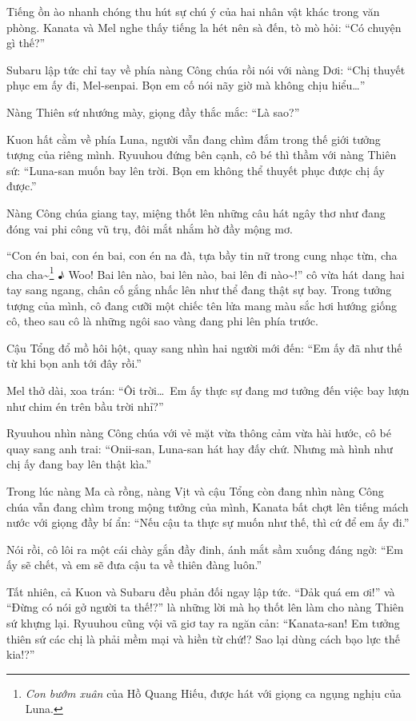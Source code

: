 \documentclass[../main.tex]{subfiles}
\begin{document}
Tiếng ồn ào nhanh chóng thu hút sự chú ý của hai nhân vật khác trong văn phòng. Kanata và Mel nghe thấy tiếng la hét nên sà đến, tò mò hỏi: ``Có chuyện gì thế?''


Subaru lập tức chỉ tay về phía nàng Công chúa rồi nói với nàng Dơi: ``Chị thuyết phục em ấy đi, Mel-senpai. Bọn em cố nói nãy giờ mà không chịu hiểu\dots''

Nàng Thiên sứ nhướng mày, giọng đầy thắc mắc: ``Là sao?''

Kuon hất cằm về phía Luna, người vẫn đang chìm đắm trong thế giới tưởng tượng của riêng mình. Ryuuhou đứng bên cạnh, cô bé thì thầm với nàng Thiên sứ: ``Luna-san muốn bay lên trời. Bọn em không thể thuyết phục được chị ấy được.''

Nàng Công chúa giang tay, miệng thốt lên những câu hát ngây thơ như đang đóng vai phi công vũ trụ, đôi mắt nhắm hờ đầy mộng mơ.

``Con én bai, con én bai, con én na đà, tựa bầy tin nữ trong cung nhạc từn, cha cha cha\~{}{}\footnote{\textit{Con bướm xuân} của Hồ Quang Hiếu, được hát với giọng ca ngụng nghịu của Luna.} ♪ Woo! Bai lên nào, bai lên nào, bai lên đi nào\~{}!'' cô vừa hát dang hai tay sang ngang, chân cố gắng nhấc lên như thể đang thật sự bay. Trong tưởng tượng của mình, cô đang cưỡi một chiếc tên lửa mang màu sắc hơi hướng giống cô, theo sau cô là những ngôi sao vàng đang phi lên phía trước.


Cậu Tổng đổ mồ hôi hột, quay sang nhìn hai người mới đến: ``Em ấy đã như thế từ khi bọn anh tới đây rồi.''

Mel thở dài, xoa trán: ``Ôi trời\dots\ Em ấy thực sự đang mơ tưởng đến việc bay lượn như chim én trên bầu trời nhỉ?''

Ryuuhou nhìn nàng Công chúa với vẻ mặt vừa thông cảm vừa hài hước, cô bé quay sang anh trai: ``Onii-san, Luna-san hát hay đấy chứ. Nhưng mà hình như chị ấy đang bay lên thật kìa.''

Trong lúc nàng Ma cà rồng, nàng Vịt và cậu Tổng còn đang nhìn nàng Công chúa vẫn đang chìm trong mộng tưởng của mình, Kanata bất chợt lên tiếng mách nước với giọng đầy bí ẩn: ``Nếu cậu ta thực sự muốn như thế, thì cứ để em ấy đi.''

Nói rồi, cô lôi ra một cái chày gắn đầy đinh, ánh mắt sầm xuống đáng ngờ: ``Em ấy sẽ chết, và em sẽ đưa cậu ta về thiên đàng luôn.''

Tất nhiên, cả Kuon và Subaru đều phản đối ngay lập tức. ``Dảk quá em ơi!'' và ``Đừng có nói gở người ta thế!?'' là những lời mà họ thốt lên làm cho nàng Thiên sứ khựng lại. Ryuuhou cũng vội vã giơ tay ra ngăn cản: ``Kanata-san! Em tưởng thiên sứ các chị là phải mềm mại và hiền từ chứ!? Sao lại dùng cách bạo lực thế kia!?''
\end{document}
